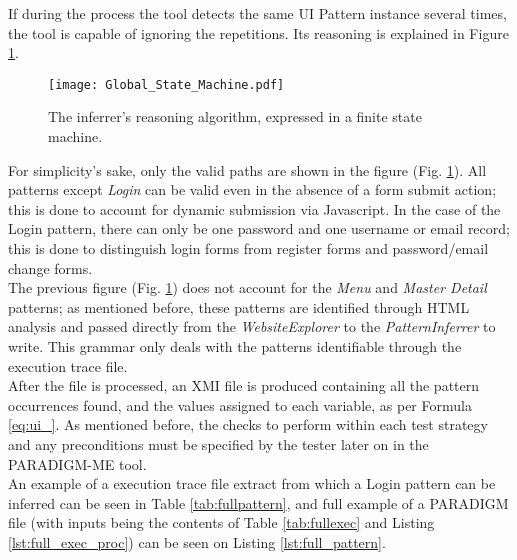 If during the process the tool detects the same UI Pattern instance several times, the tool is capable of ignoring the repetitions. Its reasoning is explained in Figure \ref{fig:inferrer}.\\

\begin{center}
\begin{figure}[!htb]
\centering
\texttt{[image: Global\_State\_Machine.pdf]}
\caption{The inferrer's reasoning algorithm, expressed in a finite state machine.}
\label{fig:inferrer}
\end{figure}
\end{center}

For simplicity's sake, only the valid paths are shown in the figure (Fig. \ref{fig:inferrer}). All patterns except \textit{Login} can be valid even in the absence of a form submit action; this is done to account for dynamic submission via Javascript. In the case of the Login pattern, there can only be one password and one username or email record; this is done to distinguish login forms from register forms and password/email change forms.\\

The previous figure (Fig. \ref{fig:inferrer}) does not account for the \textit{Menu} and \textit{Master Detail} patterns; as mentioned before, these patterns are identified through HTML analysis and passed directly from the \textit{WebsiteExplorer} to the \textit{PatternInferrer} to write. This grammar only deals with the patterns identifiable through the execution trace file.\\

After the file is processed, an XMI file is produced containing all the pattern occurrences found, and the values assigned to each variable, as per Formula \ref{eq:ui_}. As mentioned before, the checks to perform within each test strategy and any preconditions must be specified by the tester later on in the PARADIGM-ME tool.\\

An example of a execution trace file extract from which a Login pattern can be inferred can be seen in Table \ref{tab:fullpattern}, and full example of a PARADIGM file (with inputs being  the contents of Table \ref{tab:fullexec} and Listing \ref{lst:full_exec_proc}) can be seen on Listing \ref{lst:full_pattern}.


